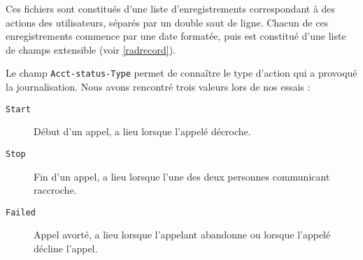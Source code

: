 
Ces fichiers sont constitués d’une liste d’enregistrements correspondant à des actions des utilisateurs, séparés par un double saut de ligne. Chacun de ces enregistrements commence par une date formatée, puis est constitué d’une liste de champs extensible (voir \cref{radrecord}).


Le champ \texttt{Acct-status-Type} permet de connaître le type d’action qui a provoqué la journalisation. Nous avons rencontré trois valeurs lors de nos essais :
\begin{description}
	\item[\texttt{Start}] Début d’un appel, a lieu lorsque l’appelé décroche.
	\item[\texttt{Stop}] Fin d’un appel, a lieu lorsque l’une des deux personnes communicant raccroche.
	\item[\texttt{Failed}] Appel avorté, a lieu lorsque l’appelant abandonne ou lorsque l’appelé décline l’appel.
\end{description}

